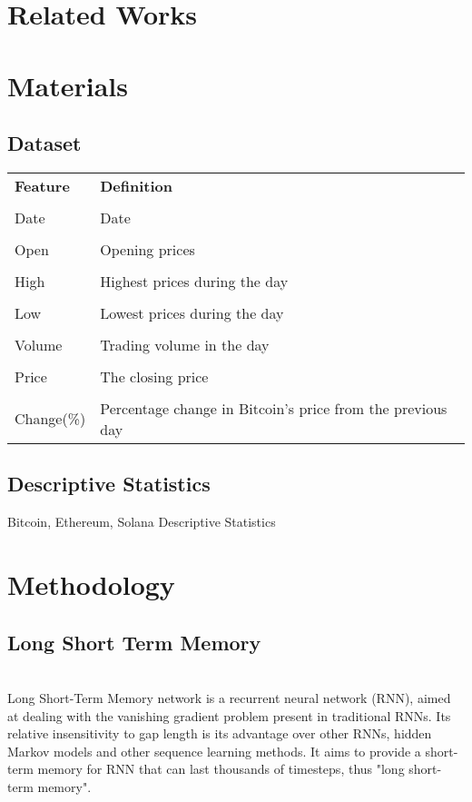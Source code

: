 \documentclass{ieeeojies}
\begin{document}
\section{Related Works}



\section{Materials}
\subsection{Dataset}
\begin{table}[H]
\centering
\begin{tabular}{l l}
 \textbf{Feature} & \textbf{Definition} \\ \\
 Date & Date \\ \\
 Open & Opening prices\\ \\
 High & Highest prices during the day \\ \\
 Low & Lowest prices during the day\\ \\
 Volume & Trading volume in the day\\ \\
Price & The closing price\\ \\
 Change(\%) & Percentage change in Bitcoin's price from the previous day\\
\end{tabular}
\end{table}
\subsection{Descriptive Statistics}
\begin{table}[H]
\caption{Bitcoin, Ethereum, Solana Descriptive Statistics}
\end{table}
\section{Methodology}
\subsection{Long Short Term Memory}\\
Long Short-Term Memory network is a recurrent neural network (RNN), aimed at dealing with the vanishing gradient problem present in traditional RNNs. Its relative insensitivity to gap length is its advantage over other RNNs, hidden Markov models and other sequence learning methods. It aims to provide a short-term memory for RNN that can last thousands of timesteps, thus "long short-term memory".
\end{document}
